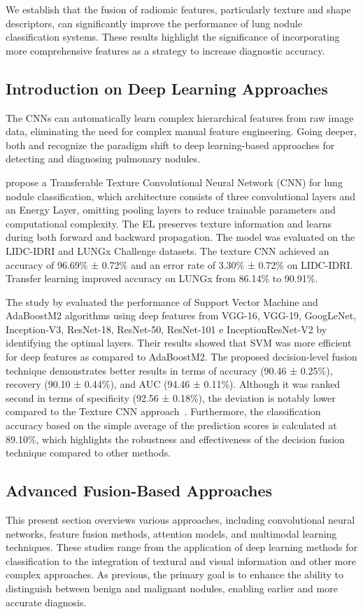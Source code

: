 We establish that the fusion of radiomic features, particularly texture and shape descriptors, can significantly improve the performance of lung nodule classification systems. These results highlight the significance of incorporating more comprehensive features as a strategy to increase diagnostic accuracy.


\subsection{Introduction on Deep Learning Approaches}
The CNNs can automatically learn complex hierarchical features from raw image data, eliminating the need for complex manual feature engineering. Going deeper, both
\citet{Halder2020} and \citet{Gu2021} recognize the paradigm shift to deep learning-based approaches for detecting and diagnosing pulmonary nodules.

\citet{Ali2020} propose a Transferable Texture Convolutional Neural Network (CNN) for lung nodule classification, which architecture consists of three convolutional layers and an Energy Layer, omitting pooling layers to reduce trainable parameters and computational complexity. The EL preserves texture information and learns during both forward and backward propagation. The model was evaluated on the LIDC-IDRI and LUNGx Challenge datasets. The texture CNN achieved an accuracy of 96.69\% ± 0.72\% and an error rate of 3.30\% ± 0.72\% on LIDC-IDRI. Transfer learning improved accuracy on LUNGx from 86.14\% to 90.91\%. 

The study by \citet{Ali2021} evaluated the performance of Support Vector Machine and AdaBoostM2 algorithms using deep features from VGG-16, VGG-19, GoogLeNet, Inception-V3, ResNet-18, ResNet-50, ResNet-101 e InceptionResNet-V2 by identifying the optimal layers. Their results showed that SVM was more efficient for deep features as compared to AdaBoostM2. The proposed decision-level fusion technique demonstrates better results in terms of accuracy (90.46 ± 0.25\%), recovery (90.10 ± 0.44\%), and AUC (94.46 ± 0.11\%). Although it was ranked second in terms of specificity (92.56 ± 0.18\%), the deviation is notably lower compared to the Texture CNN approach~\cite{Ali2020}. Furthermore, the classification accuracy based on the simple average of the prediction scores is calculated at 89.10\%, which highlights the robustness and effectiveness of the decision fusion technique compared to other methods.


\subsection{Advanced Fusion-Based Approaches}
This present section overviews various approaches, including convolutional neural networks, feature fusion methods, attention models, and multimodal learning techniques. These studies range from the application of deep learning methods for classification to the integration of textural and visual information and other more complex approaches. As previous, the primary goal is to enhance the ability to distinguish between benign and malignant nodules, enabling earlier and more accurate diagnosis.
 
